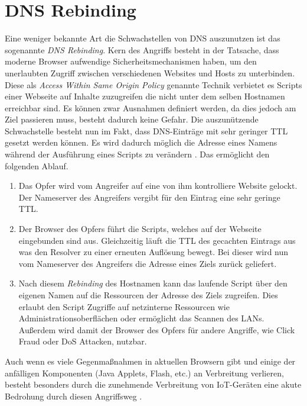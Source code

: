 \section{DNS Rebinding}
\label{sec:attack-dnsrebind}
Eine weniger bekannte Art die Schwachstellen von DNS auszunutzen ist das sogenannte \textit{DNS Rebinding}. Kern des Angriffs besteht in der Tatsache, dass moderne Browser aufwendige Sicherheitsmechanismen haben, um den unerlaubten Zugriff zwischen verschiedenen Websites und Hosts zu unterbinden. Diese als \textit{Access Within Same Origin Policy} genannte Technik verbietet es Scripts einer Webseite auf Inhalte zuzugreifen die nicht unter dem selben Hostnamen erreichbar sind. Es können zwar Ausnahmen definiert werden, da dies jedoch am Ziel passieren muss, besteht dadurch keine Gefahr. Die auszunützende Schwachstelle besteht nun im Fakt, dass DNS-Einträge mit sehr geringer TTL gesetzt werden können. Es wird dadurch möglich die Adresse eines Namens während der Ausführung eines Scripts zu verändern \cite{Jackson2009}. Das ermöglicht den folgenden Ablauf.

\begin{enumerate}
    \item Das Opfer wird vom Angreifer auf eine von ihm kontrolliere Website gelockt. Der Nameserver des Angreifers vergibt für den Eintrag eine sehr geringe TTL.
    \item Der Browser des Opfers führt die Scripts, welches auf der Webseite eingebunden sind aus. Gleichzeitig läuft die TTL des gecachten Eintrags aus was den Resolver zu einer erneuten Auflösung bewegt. Bei dieser wird nun vom Nameserver des Angreifers die Adresse eines Ziels zurück geliefert.
    \item Nach diesem \textit{Rebinding} des Hostnamen kann das laufende Script über den eigenen Namen auf die Ressourcen der Adresse des Ziels zugreifen. Dies erlaubt den Script Zugriffe auf netzinterne Ressourcen wie Administrationsoberflächen oder ermöglicht das Scannen des LANs. Außerdem wird damit der Browser des Opfers für andere Angriffe, wie Click Fraud oder DoS Attacken, nutzbar.   
\end{enumerate}

Auch wenn es viele Gegenmaßnahmen in aktuellen Browsern gibt und einige der anfälligen Komponenten (Java Applets, Flash, etc.) an Verbreitung verlieren, besteht besonders durch die zunehmende Verbreitung von IoT-Geräten eine akute Bedrohung durch diesen Angriffsweg \cite{Dorsey2018}. 


